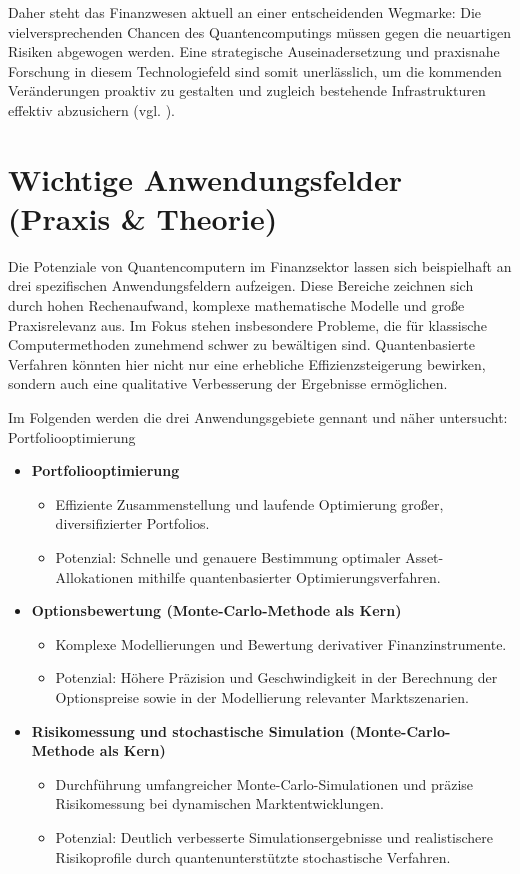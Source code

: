 Daher steht das Finanzwesen aktuell an einer entscheidenden Wegmarke: Die vielversprechenden Chancen des Quantencomputings müssen gegen die neuartigen Risiken abgewogen werden. Eine strategische Auseinadersetzung und praxisnahe Forschung in diesem Technologiefeld sind somit unerlässlich, um die kommenden Veränderungen proaktiv zu gestalten und zugleich bestehende Infrastrukturen effektiv abzusichern (vgl. \cite{egger_quantum_2020, orus_quantum_2019}).


\section{Wichtige Anwendungsfelder (Praxis \& Theorie)}

Die Potenziale von Quantencomputern im Finanzsektor lassen sich beispielhaft an drei spezifischen Anwendungsfeldern aufzeigen. Diese Bereiche zeichnen sich durch hohen Rechenaufwand, komplexe mathematische Modelle und große Praxisrelevanz aus. Im Fokus stehen insbesondere Probleme, die für klassische Computermethoden zunehmend schwer zu bewältigen sind. Quantenbasierte Verfahren könnten hier nicht nur eine erhebliche Effizienzsteigerung bewirken, sondern auch eine qualitative Verbesserung der Ergebnisse ermöglichen.

Im Folgenden werden die drei Anwendungsgebiete gennant und näher untersucht:
Portfoliooptimierung
\begin{itemize}
    \item{\textbf{Portfoliooptimierung}}
\begin{itemize}
        \item{Effiziente Zusammenstellung und laufende Optimierung großer, diversifizierter Portfolios.}
        \item{Potenzial: Schnelle und genauere Bestimmung optimaler Asset-Allokationen mithilfe quantenbasierter Optimierungsverfahren.}
\end{itemize}
\item{\textbf{Optionsbewertung (Monte-Carlo-Methode als Kern)}}
\begin{itemize}
        \item{Komplexe Modellierungen und Bewertung derivativer Finanzinstrumente.}
        \item{Potenzial: Höhere Präzision und Geschwindigkeit in der Berechnung der Optionspreise sowie in der Modellierung relevanter Marktszenarien.}
\end{itemize}
\item{\textbf{Risikomessung und stochastische Simulation (Monte-Carlo-Methode als Kern)}}
\begin{itemize}
        \item{Durchführung umfangreicher Monte-Carlo-Simulationen und präzise Risikomessung bei dynamischen Marktentwicklungen.}
        \item{Potenzial: Deutlich verbesserte Simulationsergebnisse und realistischere Risikoprofile durch quantenunterstützte stochastische Verfahren.}
\end{itemize}
\end{itemize}

